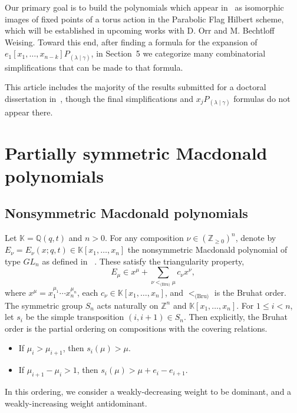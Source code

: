 \documentclass[11pt]{article}
\theoremstyle{definition}
\numberwithin{equation}{section}
\newcommand{\Q}{\mathbb{Q}}
\newcommand{\Z}{\mathbb{Z}}
\newcommand{\K}{\mathbb{K}}
\newcommand{\PP}{P_{(\lambda \mid \gamma)}}
\begin{document}
Our primary goal is to build the polynomials which appear in~\cite{MR4081116} as isomorphic images of fixed points of a torus action in the Parabolic Flag Hilbert scheme, which will be established in upcoming works with D. Orr and M. Bechtloff Weising. Toward this end, after finding a formula for the expansion of $e_1[x_1, \dotsc, x_{n-k}] \PP$, in Section~5 we categorize many combinatorial simplifications that can be made to that formula.

This article includes the majority of the results submitted for a doctoral dissertation in~\cite{Dissertation}, though the final simplifications and $x_j \PP$ formulas do not appear there.



\section{Partially symmetric Macdonald polynomials}

\subsection{Nonsymmetric Macdonald polynomials}

Let $\K=\Q(q,t)$ and $n>0$. For any composition $\nu\in(\Z_{\ge 0})^n$, denote by $E_\nu =E_\nu(x;q,t)\in \K[x_1,\dotsc,x_n]$ the nonsymmetric Macdonald polynomial of type $GL_n$ as defined in ~\cite{MR2405160}. These satisfy the triangularity property,
\begin{equation}\label{Etriangularity} E_\mu \in x^\mu + \sum_{\nu <_{\text{(Bru)}} \mu} c_\nu x^\nu,\end{equation}
where $x^\mu = x_1^{\mu_1} \dotsm x_n^{\mu_n}$, each $c_\nu \in \K[x_1,\dotsc, x_n]$, and $<_{\text{(Bru)}}$ is the Bruhat order. The symmetric group $S_n$ acts naturally on $\Z^n$ and $\K[x_1,\dotsc,x_n]$. For $1\le i<n$, let $s_i$ be the simple transposition $(i,i+1)\in S_n$. Then explicitly, the Bruhat order is the partial ordering on compositions with the covering relations.
\begin{itemize}
    \item If $\mu_i > \mu_{i+1}$, then $s_i(\mu) > \mu$.
    \item If $\mu_{i+1}-\mu_i > 1$, then $s_i(\mu) > \mu + e_i - e_{i+1}$.
\end{itemize}
In this ordering, we consider a weakly-decreasing weight to be dominant, and a weakly-increasing weight antidominant.
\end{document}
